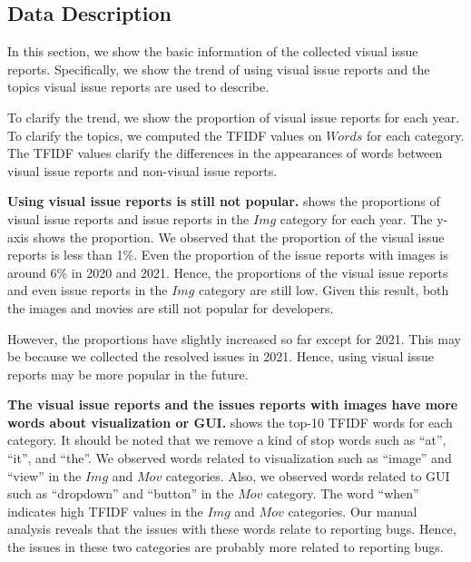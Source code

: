 


\subsection{Data Description}
In this section, we show the basic information of 
the collected visual issue reports.  
Specifically, we show the trend of using 
visual issue reports and 
the topics visual issue reports are used to describe.

To clarify the trend, we show the proportion of 
visual issue reports for each year. 
To clarify the topics, we computed the TFIDF values 
on $Words$ for each category. 
The TFIDF values clarify the differences in the appearances of 
words between visual issue reports and 
non-visual issue reports. 

\textbf{Using visual issue reports is still not popular.} 
 shows the proportions of 
visual issue reports and issue reports in the $Img$ category 
for each year. 
The y-axis shows the proportion. 
We observed that the proportion of the visual issue reports is 
less than 1\%. 
Even the proportion of the issue reports with images is around 6\% 
in 2020 and 2021. 
Hence, the proportions of the visual issue reports and 
even issue reports in the $Img$ category are still low. 
Given this result, both the images and movies are still not 
popular for developers. 

However, the proportions have slightly increased so far 
except for 2021. 
This may be because we collected the resolved issues 
in 2021. 
Hence, using visual issue reports may be more popular in the future. 




\textbf{The visual issue reports and the issues 
reports with images have more words 
about visualization or GUI.}
 shows the top-10 TFIDF words
for each category.
It should be noted that we remove a kind of stop words such as 
``at'', ``it'', and ``the''. 
We observed words related to visualization such as 
``image'' and ``view'' in the $Img$ and $Mov$ categories. 
Also, we observed words related to GUI such as 
``dropdown'' and ``button'' in the $Mov$ category. 
The word ``when'' indicates high TFIDF values 
in the $Img$ and $Mov$ categories. 
Our manual analysis reveals that the issues with 
these words relate to reporting bugs. 
Hence, the issues in these two categories are 
probably more related to reporting bugs. 

